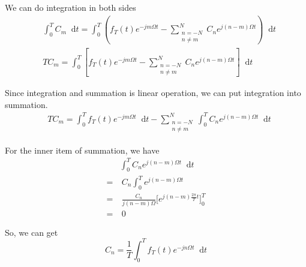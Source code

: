 \documentclass[margin,line]{res}
\newcommand*{\dif}{\mathop{}\!\mathrm{d}}
\begin{document}
\begin{resume}
We can do integration in both sides
\begin{align}
&\int_{0}^{T}{C_m\dif t}=\int_{0}^{T}{(f_T(t) e^{-jm\Omega t}-
	\sum\limits_{ \substack{n=-N \\ n\neq m} }^{N}{C_n e^{j(n-m)\Omega t}})
	\dif t} \nonumber \\
&TC_m=\int_{0}^{T}{[f_T(t) e^{-jm\Omega t}-
	\sum\limits_{ \substack{n=-N \\ n\neq m} }^{N}{C_n e^{j(n-m)\Omega t}}]
	\dif t} \nonumber
\end{align}

Since integration and summation is linear operation, we can put integration into summation.
\begin{align}
	&TC_m=\int_{0}^{T}{f_T(t) e^{-jm\Omega t}} \dif t -
		\sum\limits_{ \substack{n=-N \\ n\neq m} }^{N}{
			\int_{0}^{T}C_n e^{j(n-m)\Omega t} \dif t
		} \nonumber
\end{align}

For the inner item of summation, we have
\begin{align}
&\int_{0}^{T}{C_n e^{j(n-m)\Omega t} \dif t } \nonumber \\
=&\ C_n\int_{0}^{T} e^{j(n-m)\Omega t} \nonumber \\
=&\ \frac{C_n}{j(n-m)\Omega} \Big[ e^{ j(n-m) \frac{2\pi}{T} t} \Big]_{0}^{T} \nonumber \\
=&\ 0 \nonumber
\end{align}

So, we can get
$$
C_n=\frac{1}{T}\int_0^T{f_T(t) e^{-jn\Omega t} \dif t}
$$


\end{resume}
\end{document}
